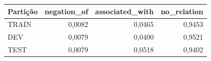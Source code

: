 \begin{tabular}{lrrr}
\toprule
Partição & negation\_of & associated\_with & no\_relation \\
\midrule
TRAIN & 0,0082 & 0,0465 & 0,9453 \\
DEV & 0,0079 & 0,0400 & 0,9521 \\
TEST & 0,0079 & 0,0518 & 0,9402 \\
\bottomrule
\end{tabular}
